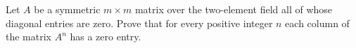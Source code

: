Let $A$ be a symmetric $m\times m$ matrix over the two-element field all of whose diagonal entries are zero. Prove that for every positive integer $n$ each column of the matrix $A^n$ has a zero entry.